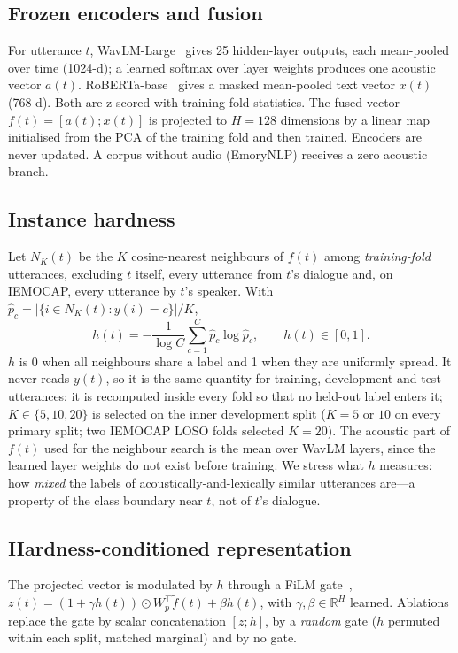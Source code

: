 \documentclass[journal]{IEEEtran}
\begin{document}
\subsection{Frozen encoders and fusion}
For utterance $t$, WavLM-Large~\cite{chen2022wavlm} gives 25 hidden-layer outputs, each mean-pooled over time (1024-d); a learned softmax over layer weights produces one acoustic vector $a(t)$. RoBERTa-base~\cite{liu2019roberta} gives a masked mean-pooled text vector $x(t)$ (768-d). Both are z-scored with training-fold statistics. The fused vector $f(t) = [a(t); x(t)]$ is projected to $H = 128$ dimensions by a linear map initialised from the PCA of the training fold and then trained. Encoders are never updated. A corpus without audio (EmoryNLP) receives a zero acoustic branch.

\subsection{Instance hardness}
Let $N_K(t)$ be the $K$ cosine-nearest neighbours of $f(t)$ among \emph{training-fold} utterances, excluding $t$ itself, every utterance from $t$'s dialogue and, on IEMOCAP, every utterance by $t$'s speaker. With $\hat p_c = |\{i \in N_K(t): y(i) = c\}| / K$,
\begin{equation}
h(t) = -\frac{1}{\log C}\sum_{c=1}^{C} \hat p_c \log \hat p_c, \qquad h(t) \in [0,1].
\end{equation}
$h$ is 0 when all neighbours share a label and 1 when they are uniformly spread. It never reads $y(t)$, so it is the same quantity for training, development and test utterances; it is recomputed inside every fold so that no held-out label enters it; $K \in \{5, 10, 20\}$ is selected on the inner development split ($K = 5$ or $10$ on every primary split; two IEMOCAP LOSO folds selected $K = 20$). The acoustic part of $f(t)$ used for the neighbour search is the mean over WavLM layers, since the learned layer weights do not exist before training. We stress what $h$ measures: how \emph{mixed} the labels of acoustically-and-lexically similar utterances are---a property of the class boundary near $t$, not of $t$'s dialogue.

\subsection{Hardness-conditioned representation}
The projected vector is modulated by $h$ through a FiLM gate~\cite{perez2018film}, $z(t) = (1 + \gamma h(t)) \odot W_p^{\top} \tilde f(t) + \beta h(t)$, with $\gamma, \beta \in \mathbb{R}^H$ learned. Ablations replace the gate by scalar concatenation $[z; h]$, by a \emph{random} gate ($h$ permuted within each split, matched marginal) and by no gate.
\end{document}
